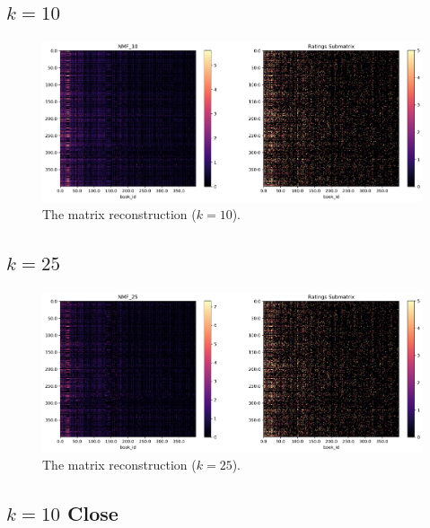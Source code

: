 \documentclass[handout]{beamer}
\begin{document}
\subsection{$k=10$}\label{k-10}

\begin{frame}
 \begin{figure}[t]
    \includegraphics[width=\linewidth]{../image/goodreads-models/nmf-10-left.png}
    \caption[NMF-10]{The matrix reconstruction ($k=10$).}
     \label{fig:nmf-1}
\end{figure}
\end{frame}

\subsection{$k=25$}\label{k-25}

\begin{frame}
 \begin{figure}[t]
    \includegraphics[width=\linewidth]{../image/goodreads-models/nmf-25-left.png}
    \caption[NMF-25]{The matrix reconstruction ($k=25$).}
     \label{fig:nmf-25}
\end{figure}
\end{frame}


\subsection{$k=10$ Close}\label{k-10-close}
\end{document}
